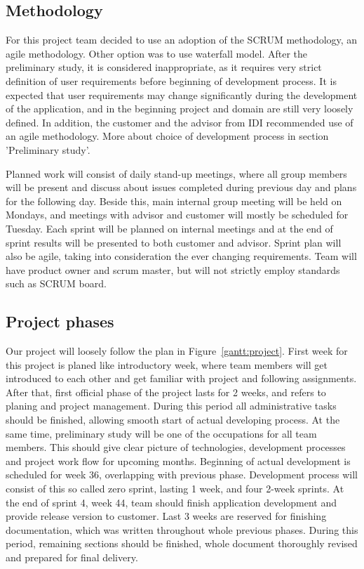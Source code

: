 \subsection{Methodology}

For this project team decided to use an adoption of the SCRUM methodology, an agile methodology. Other option was to use waterfall model. After the preliminary study, it is considered inappropriate, as it requires very strict definition of user requirements before beginning of development process. It is expected that user requirements may change significantly during the development of the application, and in the beginning project and domain are still very loosely defined. In addition, the customer and the advisor from IDI recommended use of an agile methodology. More about choice of development process in section 'Preliminary study'.

Planned work will consist of daily stand-up meetings, where all group members will be present and discuss about issues completed during previous day and plans for the following day. Beside this, main internal group meeting will be held on Mondays, and meetings with advisor and customer will mostly be scheduled for Tuesday. Each sprint will be planned on internal meetings and at the end of sprint results will be presented to both customer and advisor. Sprint plan will also be agile, taking into consideration the ever changing requirements. Team will have product owner and scrum master, but will not strictly employ standards such as SCRUM board. 

\subsection{Project phases}

Our project will loosely follow the plan in Figure~\ref{gantt:project}.
First week for this project is planed like introductory week, where team members will get introduced to each other and get familiar with project and following assignments.\newline
After that, first official phase of the project lasts for 2 weeks, and refers to planing and project management. During this period all administrative tasks should be finished, allowing smooth start of actual developing process. At the same time, preliminary study will be one of the occupations for all team members. This should give clear picture of technologies, development processes and project work flow for upcoming months.\newline
Beginning of actual development is scheduled for week 36, overlapping with previous phase. Development process will consist of this so called zero sprint, lasting 1 week, and four 2-week sprints. At the end of sprint 4, week 44, team should finish application development and provide release version to customer.\newline
Last 3 weeks are reserved for finishing documentation, which was written throughout whole previous phases. During this period, remaining sections should be finished, whole document thoroughly revised and prepared for final delivery.\newline
 

